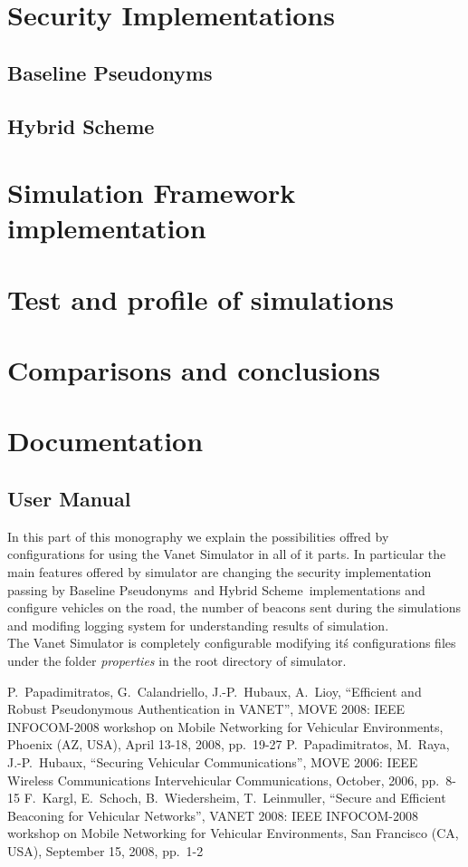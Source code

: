\documentclass[a4paper,12pt]{article}
\def\baseline{Baseline Pseudonyms~}
\def\hybrid{Hybrid Scheme~}
\begin{document}
\section{Security Implementations}
\subsection{\baseline}

\subsection{\hybrid}

\section{Simulation Framework implementation}

\section{Test and profile of simulations}
\section{Comparisons and conclusions}
\section{Documentation}
\subsection{User Manual}
In this part of this monography we explain the possibilities offred by configurations for using the Vanet Simulator in all of it parts. In particular the main features offered by simulator are changing the security implementation passing by \baseline and \hybrid implementations and configure vehicles on the road, the number of beacons sent during the simulations and modifing logging system for understanding results of simulation.\\
The Vanet Simulator is completely configurable modifying it\'s configurations files under the folder \textit{properties} in the root directory of simulator.


\begin{thebibliography}{99}
%
%
P.~Papadimitratos, G.~Calandriello, J.-P.~Hubaux, A.~Lioy,
``Efficient and Robust Pseudonymous Authentication in VANET'',
MOVE 2008: IEEE INFOCOM-2008 workshop on Mobile Networking for Vehicular Environments,
Phoenix (AZ, USA), April 13-18, 2008, pp.~19-27 
P.~Papadimitratos, M.~Raya, J.-P.~Hubaux,
``Securing Vehicular Communications'',
MOVE 2006: IEEE Wireless Communications Intervehicular Communications,
October, 2006, pp.~8-15 
F.~Kargl, E.~Schoch, B.~Wiedersheim, T.~Leinmuller,
``Secure and Efficient Beaconing for Vehicular Networks'',
VANET 2008: IEEE INFOCOM-2008 workshop on Mobile Networking for Vehicular Environments,
San Francisco (CA, USA), September 15, 2008, pp.~1-2 
\end{thebibliography}
\end{document}
